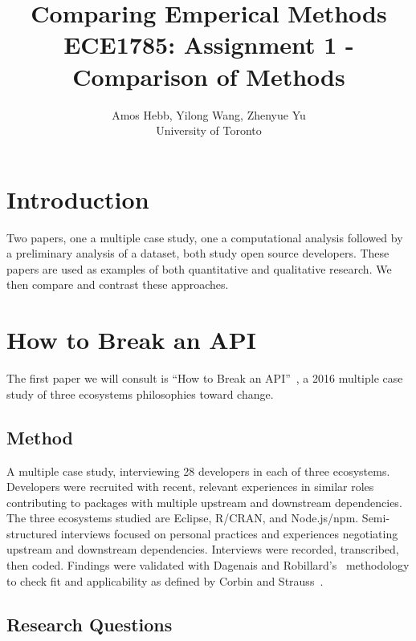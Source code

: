 \documentclass[12pt]{IEEEtran}
\begin{document}
\title{Comparing Emperical Methods\\
{\normalsize ECE1785: Assignment 1 - Comparison of Methods}}

\author{Amos Hebb, Yilong Wang, Zhenyue Yu\\ \small University of Toronto}

\maketitle

\section{Introduction}

Two papers, one a multiple case study, one a computational analysis followed by a preliminary analysis of a dataset, both study open source developers.
These papers are used as examples of both quantitative and qualitative research.
We then compare and contrast these approaches.

\section{How to Break an API}

The first paper we will consult is ``How to Break an API''~\cite{bogart2016break}, a 2016 multiple case study of three ecosystems philosophies toward change.

\subsection{Method}

A multiple case study, interviewing 28 developers in each of three ecosystems. Developers were recruited with recent, relevant experiences in similar roles contributing to packages with multiple upstream and downstream dependencies.
The three ecosystems studied are Eclipse, R/CRAN, and Node.js/npm.
Semi-structured interviews focused on personal practices and experiences negotiating upstream and downstream dependencies.
Interviews were recorded, transcribed, then coded.
Findings were validated with Dagenais and Robillard's~\cite{dagenais2010creating} methodology to check fit and applicability as defined by Corbin and Strauss~\cite{corbin2014basics}.

\subsection{Research Questions}
\end{document}
